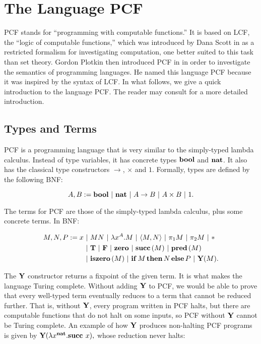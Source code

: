 
\section{The Language PCF}\label{sec:pcf}

PCF stands for ``programming with computable functions.'' It is based on LCF, the ``logic of computable functions,'' which was introduced by Dana Scott in \cite{LCF} as a restricted formalism for investigating computation, one better suited to this task than set theory. Gordon Plotkin then introduced PCF in \cite{PCF} in order to investigate the semantics of programming languages. He named this language PCF because it was inspired by the syntax of LCF. In what follows, we give a quick introduction to the language PCF. The reader may consult \cite{LambdaNotes} for a more detailed introduction.

\subsection{Types and Terms}

PCF is a programming language that is very similar to the simply-typed lambda calculus. Instead of type variables, it has concrete types $\mathbf{bool}$ and $\mathbf{nat}$. It also has the classical type constructors $\to$, $\times$ and $1$. Formally, types are defined by the following BNF:

\[ A, B := \mathbf{bool} \ \mathbf{|}\  \mathbf{nat} \ \mathbf{|}\  A\to B \ \mathbf{|}\  A\times B \ \mathbf{|}\  1. \]

The terms for PCF are those of the simply-typed lambda calculus, plus some concrete terms. In BNF:

\begin{align*}
    M, N, P := x &\ \mathbf{|}\  MN \ \mathbf{|}\  \lambda x^A.M \ \mathbf{|}\  \langle M, N\rangle \ \mathbf{|}\  \pi_1M \ \mathbf{|}\  \pi_2M \ \mathbf{|}\  * \\
    &\ \mathbf{|}\  \mathbf{T} \ \mathbf{|}\  \mathbf{F} \ \mathbf{|}\  \mathbf{zero} \ \mathbf{|}\  \mathbf{succ}\,(M) \ \mathbf{|}\  \mathbf{pred}\,(M) \\
    &\ \mathbf{|}\  \mathbf{iszero}\,(M) \ \mathbf{|}\  \mathbf{if}\,M\,\mathbf{then}\,N\,\mathbf{else}\,P \ \mathbf{|}\  \mathbf{Y}(M).
\end{align*}

The $\mathbf{Y}$ constructor returns a fixpoint of the given term. It is what makes the language Turing complete. Without adding $\textbf{Y}$ to PCF, we would be able to prove that every well-typed term eventually reduces to a term that cannot be reduced further. That is, without $\textbf{Y}$, every program written in PCF halts, but there are computable functions that do not halt on some inputs, so PCF without $\textbf{Y}$ cannot be Turing complete. An example of how $\textbf{Y}$ produces non-halting PCF programs is given by $\textbf{Y}(\lambda x^{\textbf{nat}}. \textbf{succ } x),$ whose reduction never halts:

